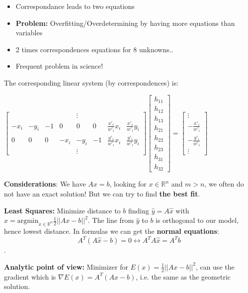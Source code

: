 \begin{itemize}
    \item Correspondance leads to two equations
    \item \textbf{Problem:} Overfitting/Overdetermining by having more equations than variables
    \item 2 times correspondences equations for $8$ unknowns..
    \item Frequent problem in science!
\end{itemize}

The corresponding linear system (by correspondences) is:

$\left[\begin{matrix}
& & & & \vdots & & & \\
-x_i & -y_i & -1 & 0 & 0 & 0 & \frac{x'_i}{w'_i}x_i & \frac{x'_i}{w'_i} y_i \\
0 & 0 & 0 & -x_i & -y_i & -1 & \frac{y'_i}{w'_i}x_i & \frac{y'_i}{w'_i} y_i \\
& & & & \vdots & & &
\end{matrix}\right]\left[
\begin{matrix}
h_{11} \\h_{12} \\h_{13} \\h_{21} \\h_{22} \\h_{23} \\h_{31} \\h_{32}
\end{matrix}\right] = \left[
\begin{matrix}
\vdots \\ -\frac{x'_i}{w'_i} \\ -\frac{y'_i}{w'_i} \\ \vdots
\end{matrix}\right]
$

\textbf{Considerations}: We have $Ax = b$, looking for $x \in \mathbb{R}^n$ and $ m > n$, we often do not have an exact solution! But we can try to find \textbf{the best fit}.

\textbf{Least Squares:} Minimize distance to $b$ finding $\hat{y} = A\hat{x}$ with $\hat{x} = \mathrm{argmin}_{x\in \mathbb{R}^n} \frac{1}{2} ||Ax - b||^2$. The line from $\hat{y}$ to $b$ is orthogonal to our model, hence lowest distance. In formulas we can get the \textbf{normal equations}: $$A^T (A\hat{x} -b ) = 0 \leftrightarrow A^T A\hat{x} = A^T b$$.

\textbf{Analytic point of view:} Minimizer for $E(x) = \frac{1}{2}||Ax - b||^2$, can use the gradient which is $\nabla E(x) = A^T (Ax - b)$, i.e. the same as the geometric solution.

